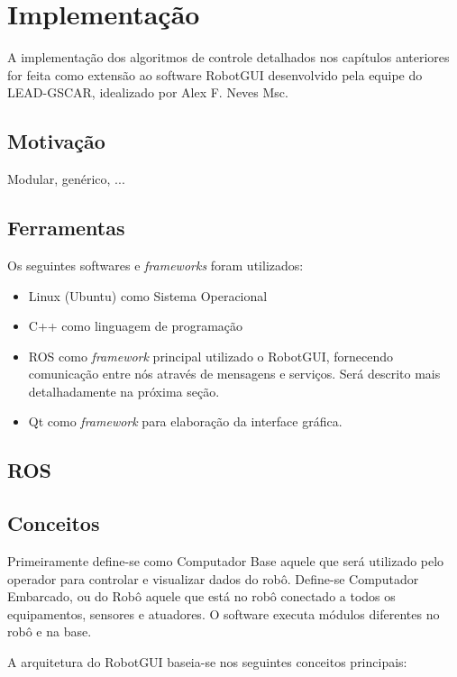 \chapter{Implementação}
A implementação dos algoritmos de controle detalhados nos capítulos anteriores for feita como extensão ao software RobotGUI desenvolvido pela equipe do LEAD-GSCAR, idealizado por Alex F. Neves Msc. 

\section{Motivação} 
Modular, genérico, ...

\section{Ferramentas}
Os seguintes softwares e \textit{frameworks} foram utilizados:

\begin{itemize}
\item Linux (Ubuntu) como Sistema Operacional
\item C++ como linguagem de programação
\item ROS como \textit{framework} principal utilizado o RobotGUI, fornecendo comunicação entre nós através de mensagens e serviços. Será descrito mais detalhadamente na próxima seção.
\item Qt como \textit{framework} para elaboração da interface gráfica. 
\end{itemize}

\section{ROS}

\section{Conceitos}

Primeiramente define-se como Computador Base aquele que será utilizado pelo operador para controlar e visualizar dados do robô. Define-se Computador Embarcado, ou do Robô aquele que está no robô conectado a todos os equipamentos, sensores e atuadores. O software executa módulos diferentes no robô e na base.

A arquitetura do RobotGUI baseia-se nos seguintes conceitos principais:

